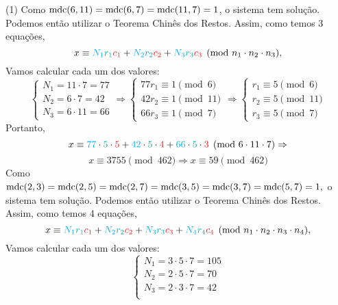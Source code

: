 \documentclass[12pt, a4paper]{article}
\newcommand{\mdc}{{\rm mdc}}
\newcommand{\negrito}[1]{\mbox{\boldmath{$#1$}}}
\newcommand{\itens}[1]{\begin{tasks}[label={(tsk[a])},label-width=3.6ex, label-format = {\bfseries}, column-sep = {0pt}](1) #1\end{tasks}}
\newcommand{\alt}[1]{\textcolor{Floresta}{$\negrito{(#1)} $}}
\begin{document}
\begin{solution}
\itens{  \task[\alt{b}] Como $\mdc(6,11)=\mdc(6,7)=\mdc(11,7)=1$, o sistema tem solução. Podemos então utilizar o Teorema Chinês dos Restos. Assim, como temos 3 equações,
 \[x \equiv \textcolor{Cyan}{N_1}\textcolor{Emerald}{r_1}\textcolor{Red}{c_1} + \textcolor{Cyan}{N_2}\textcolor{Emerald}{r_2}\textcolor{Red}{c_2} + \textcolor{Cyan}{N_3}\textcolor{Emerald}{r_3}\textcolor{Red}{c_3} \pmod{n_1 \cdot n_2 \cdot n_3},\]
Vamos calcular cada um dos valores:
      $$\left\{ \begin{array}{l}
             N_1 = 11\cdot7=77\\
             N_2 = 6\cdot7=42\\
             N_3 = 6\cdot11=66
        \end{array}\right.\Rightarrow
        \left\{ \begin{array}{l}
             77r_1 \equiv 1\pmod 6\\
             42r_2 \equiv 1\pmod{11}\\
             66r_3 \equiv 1\pmod 7
        \end{array}\right. \Rightarrow 
        \left\{ \begin{array}{l}
             r_1 \equiv 5\pmod 6\\
             r_2 \equiv 5\pmod{11}\\
             r_3 \equiv 5\pmod 7
        \end{array}\right.$$
Portanto,
        $$x \equiv \textcolor{Cyan}{77}\cdot\textcolor{Emerald}{5}\cdot\textcolor{Red}{5}+\textcolor{Cyan}{42}\cdot\textcolor{Emerald}{5}\cdot\textcolor{Red}{4}+\textcolor{Cyan}{66}\cdot\textcolor{Emerald}{5}\cdot\textcolor{Red}{3} \pmod{ 6\cdot11\cdot7} \Rightarrow$$
        $$x \equiv 3755 \pmod{462} \Rightarrow \boxed{x \equiv 59 \pmod{462}}$$
  \task[\alt{c}] Como $\mdc(2,3)=\mdc(2,5)=\mdc(2,7)=\mdc(3,5)=\mdc(3,7)=\mdc(5,7)=1,$ o sistema tem solução. Podemos então utilizar o Teorema Chinês dos Restos. Assim, como temos 4 equações,
 \[x \equiv \textcolor{Cyan}{N_1}\textcolor{Emerald}{r_1}\textcolor{Red}{c_1} + \textcolor{Cyan}{N_2}\textcolor{Emerald}{r_2}\textcolor{Red}{c_2} + \textcolor{Cyan}{N_3}\textcolor{Emerald}{r_3}\textcolor{Red}{c_3} + \textcolor{Cyan}{N_4}\textcolor{Emerald}{r_4}\textcolor{Red}{c_4} \pmod{n_1 \cdot n_2 \cdot n_3 \cdot n_4},\]
Vamos calcular cada um dos valores:
      $$\left\{ \begin{array}{l}
             N_1 = 3\cdot5 \cdot7=105\\
             N_2 = 2\cdot5\cdot 7=70\\
             N_3 = 2\cdot3\cdot7=42\\

\end{array}$$}
\end{solution}
\end{document}
